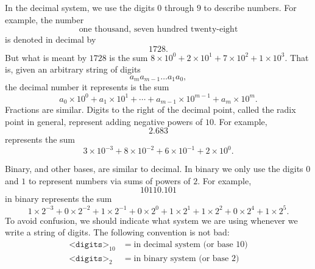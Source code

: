 \documentclass[11pt,leqno]{article}
\begin{document}
In the decimal system, we use the digits $0$ through $9$ to describe numbers. For example, the number 
\[\text{one thousand, seven hundred twenty-eight}\]
is denoted in decimal by
\[1728.\]
But what is meant by $1728$ is the sum $8\times 10^0 + 2\times 10^1 + 7\times 10^2 + 1\times 10^3$. That is, given an arbitrary string of digits
\[a_ma_{m-1}\dots a_1a_0,\]
the decimal number it represents is the sum
\[a_0\times 10^0 + a_1\times 10^1+\cdots + a_{m-1}\times 10^{m-1} + a_m\times 10^m.\] Fractions are similar. Digits to the right of the decimal point, called the radix point in general, represent adding negative powers of $10$. For example, 
\[2.683\]
represents the sum 
\[3\times 10^{-3} + 8\times 10^{-2} + 6\times 10^{-1} + 2\times 10^0.\]

Binary, and other bases, are similar to decimal. In binary we only use the digits $0$ and $1$ to represent numbers via sums of powers of $2$. For example, 
\[10110.101\]
in binary represents the sum
\[1\times 2^{-3} + 0\times 2^{-2} + 1\times 2^{-1} + 0\times 2^0 + 1\times 2^1 + 1\times 2^2 + 0\times 2^4 + 1\times 2^5.\]
To avoid confusion, we should indicate what system we are using whenever we write a string of digits. The following convention is not bad:
\begin{align*}
    {\texttt{<digits>}}_{10} &= \text{in decimal system (or base $10$)}\\
    {\texttt{<digits>}}_{2} &= \text{in binary system (or base $2$)}
\end{align*}
\end{document}
